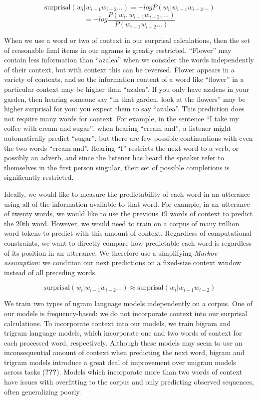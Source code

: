 \documentclass[10pt, letterpaper]{article}
\begin{document}
\[\text{surprisal}(w_i|w_{i-1}w_{i-2}...) = -log P(w_i|w_{i-1}w_{i-2}...)\]
\[= -log \frac{P(w_i,w_{i-1}w_{i-2},...)}{P(w_{i-1}w_{i-2}...)}\]

When we use a word or two of context in our surprisal calculations, then
the set of reasonable final items in our ngrams is greatly restricted.
``Flower'' may contain less information than ``azalea'' when we consider
the words independently of their context, but with context this can be
reversed. Flower appears in a variety of contexts, and so the
information content of a word like ``flower'' in a particular context
may be higher than ``azalea''. If you only have azaleas in your garden,
then hearing someone say ``in that garden, look at the flowers'' may be
higher surprisal for you: you expect them to say ``azalea''. This
prediction does not require many words for context. For example, in the
sentence ``I take my coffee with cream and sugar'', when hearing ``cream
and'', a listener might automatically predict ``sugar'', but there are
few possible continuations with even the two words ``cream and''.
Hearing ``I'' restricts the next word to a verb, or possibly an adverb,
and since the listener has heard the speaker refer to themselves in the
first person singular, their set of possible completions is
significantly restricted.

Ideally, we would like to measure the predictability of each word in an
utterance using all of the information available to that word. For
example, in an utterance of twenty words, we would like to use the
previous \(19\) words of context to predict the \(20\)th word. However,
we would need to train on a corpus of many trillion word tokens to
predict with this amount of context. Regardless of computational
constraints, we want to directly compare how predictable each word is
regardless of its position in an utterance. We therefore use a
simplifying \emph{Markov assumption}: we condition our next predictions
on a fixed-size context window instead of all preceding words.

\[\text{surprisal}(w_i|w_{i-1}w_{i-2}...) \approx \text{surprisal}(w_i|w_{i-1}w_{i-2})\]

We train two types of ngram language models independently on a corpus.
One of our models is frequency-based: we do not incorporate context into
our surprisal calculations. To incorporate context into our models, we
train bigram and trigram language models, which incorporate one and two
words of context for each processed word, respectively. Although these
models may seem to use an inconsequential amount of context when
predicting the next word, bigram and trigram models introduce a great
deal of improvement over unigram models across tasks ({\textbf{???}}).
Models which incorporate more than two words of context have issues with
overfitting to the corpus and only predicting observed sequences, often
generalizing poorly.
\end{document}
